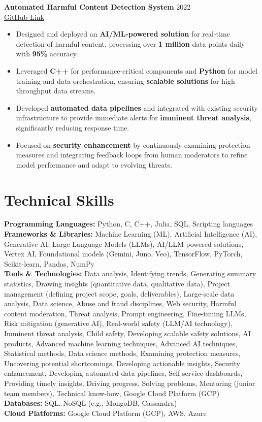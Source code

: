 \documentclass[11pt,a4paper]{article}
\begin{document}
\textbf{Automated Harmful Content Detection System} \hfill 2022 \\
\href{https://github.com/johndoe/harmful-content-detector}{GitHub Link}
\begin{itemize}
    \item Designed and deployed an \textbf{AI/ML-powered solution} for real-time detection of harmful content, processing over \textbf{1 million} data points daily with \textbf{95\%} accuracy.
    \item Leveraged \textbf{C++} for performance-critical components and \textbf{Python} for model training and data orchestration, ensuring \textbf{scalable solutions} for high-throughput data streams.
    \item Developed \textbf{automated data pipelines} and integrated with existing security infrastructure to provide immediate alerts for \textbf{imminent threat analysis}, significantly reducing response time.
    \item Focused on \textbf{security enhancement} by continuously examining protection measures and integrating feedback loops from human moderators to refine model performance and adapt to evolving threats.
\end{itemize}

\section*{Technical Skills}
\textbf{Programming Languages:} Python, C, C++, Julia, SQL, Scripting languages \\
\textbf{Frameworks \& Libraries:} Machine Learning (ML), Artificial Intelligence (AI), Generative AI, Large Language Models (LLMs), AI/LLM-powered solutions, Vertex AI, Foundational models (Gemini, Juno, Veo), TensorFlow, PyTorch, Scikit-learn, Pandas, NumPy \\
\textbf{Tools \& Technologies:} Data analysis, Identifying trends, Generating summary statistics, Drawing insights (quantitative data, qualitative data), Project management (defining project scope, goals, deliverables), Large-scale data analysis, Data science, Abuse and fraud disciplines, Web security, Harmful content moderation, Threat analysis, Prompt engineering, Fine-tuning LLMs, Risk mitigation (generative AI), Real-world safety (LLM/AI technology), Imminent threat analysis, Child safety, Developing scalable safety solutions, AI products, Advanced machine learning techniques, Advanced AI techniques, Statistical methods, Data science methods, Examining protection measures, Uncovering potential shortcomings, Developing actionable insights, Security enhancement, Developing automated data pipelines, Self-service dashboards, Providing timely insights, Driving progress, Solving problems, Mentoring (junior team members), Technical know-how, Google Cloud Platform (GCP) \\
\textbf{Databases:} SQL, NoSQL (e.g., MongoDB, Cassandra) \\
\textbf{Cloud Platforms:} Google Cloud Platform (GCP), AWS, Azure
\end{document}
